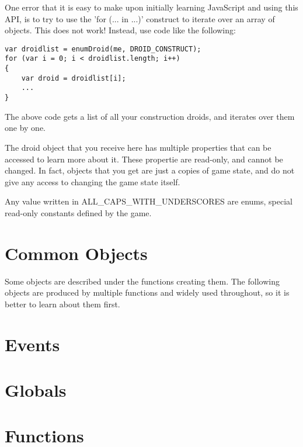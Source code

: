 \documentclass[12pt]{article}
\begin{document}
One error that it is easy to make upon initially learning JavaScript and using this API, is to try to use
the 'for (... in ...)' construct to iterate over an array of objects. This does not work! Instead, use code
like the following:

\begin{lstlisting}
var droidlist = enumDroid(me, DROID_CONSTRUCT);
for (var i = 0; i < droidlist.length; i++)
{
	var droid = droidlist[i];
	...
}
\end{lstlisting}

The above code gets a list of all your construction droids, and iterates over them one by one.

The droid object that you receive here has multiple properties that can be accessed to learn more about it. 
These propertie are read-only, and cannot be changed. In fact, objects that you get are just a copies of 
game state, and do not give any access to changing the game state itself.

Any value written in ALL_CAPS_WITH_UNDERSCORES are enums, special read-only constants defined by the
game.

\section{Common Objects}

Some objects are described under the functions creating them. The following objects are produced by
multiple functions and widely used throughout, so it is better to learn about them first.



\section{Events}



\section{Globals}

\flushleft
\begin{description}

\end{description}

\section{Functions}


\end{document}

